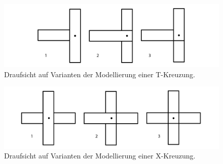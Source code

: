 \begin{figure}[ht]
    \centering
    \includegraphics[width=0.8\columnwidth]{fig/t_joint_variationen.png}
    \caption{Draufsicht auf Varianten der Modellierung einer T-Kreuzung.}\label{fig:concept:t_joint_variationen}
\end{figure}

\begin{figure}[hb]
    \centering
    \includegraphics[width=0.8\columnwidth]{fig/x_joint_variationen.png}
    \caption{Draufsicht auf Varianten der Modellierung einer X-Kreuzung.}\label{fig:concept:x_joint_variationen}
\end{figure}


